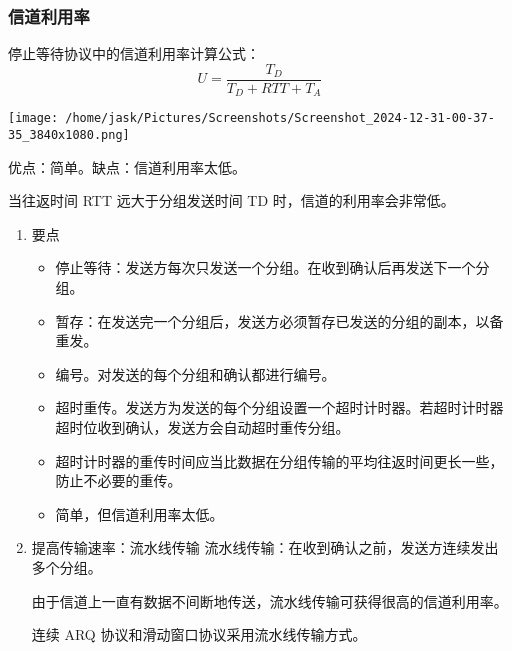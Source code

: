 \documentclass[11pt]{article}
\begin{document}
\subsubsection{信道利用率}
\label{sec:org52b905e}
停止等待协议中的信道利用率计算公式：
\[
  U = \frac{T_D}{T_D + RTT + T_A}
\]

\begin{center}
\texttt{[image: /home/jask/Pictures/Screenshots/Screenshot\_2024-12-31-00-37-35\_3840x1080.png]}
\end{center}

优点：简单。缺点：信道利用率太低。

当往返时间 RTT 远大于分组发送时间 TD 时，信道的利用率会非常低。
\begin{enumerate}
\item 要点
\label{sec:org241e83a}
\begin{itemize}
\item 停止等待：发送方每次只发送一个分组。在收到确认后再发送下一个分组。
\item 暂存：在发送完一个分组后，发送方必须暂存已发送的分组的副本，以备重发。
\item 编号。对发送的每个分组和确认都进行编号。
\item 超时重传。发送方为发送的每个分组设置一个超时计时器。若超时计时器超时位收到确认，发送方会自动超时重传分组。
\item 超时计时器的重传时间应当比数据在分组传输的平均往返时间更长一些，防止不必要的重传。
\item 简单，但信道利用率太低。
\end{itemize}
\item 提高传输速率：流水线传输
\label{sec:orgc30dc7a}
流水线传输：在收到确认之前，发送方连续发出多个分组。

由于信道上一直有数据不间断地传送，流水线传输可获得很高的信道利用率。

连续 ARQ 协议和滑动窗口协议采用流水线传输方式。
\end{enumerate}
\end{document}
